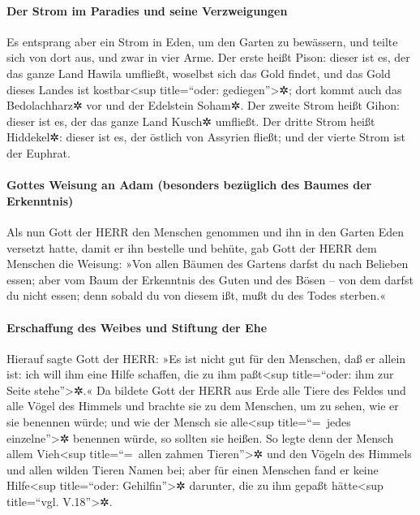 \hypertarget{der-strom-im-paradies-und-seine-verzweigungen}{%
\paragraph{Der Strom im Paradies und seine
Verzweigungen}\label{der-strom-im-paradies-und-seine-verzweigungen}}

 Es entsprang aber ein Strom in Eden, um den Garten zu
bewässern, und teilte sich von dort aus, und zwar in vier Arme.
 Der erste heißt Pison: dieser ist es, der das ganze Land
Hawila umfließt, woselbst sich das Gold findet,  und das
Gold dieses Landes ist kostbar\textless sup title=``oder:
gediegen''\textgreater✲; dort kommt auch das Bedolachharz✲ vor und der
Edelstein Soham✲.  Der zweite Strom heißt Gihon: dieser
ist es, der das ganze Land Kusch✲ umfließt.  Der dritte
Strom heißt Hiddekel✲: dieser ist es, der östlich von Assyrien fließt;
und der vierte Strom ist der Euphrat.

\hypertarget{gottes-weisung-an-adam-besonders-bezuxfcglich-des-baumes-der-erkenntnis}{%
\paragraph{Gottes Weisung an Adam (besonders bezüglich des Baumes der
Erkenntnis)}\label{gottes-weisung-an-adam-besonders-bezuxfcglich-des-baumes-der-erkenntnis}}

 Als nun Gott der HERR den Menschen genommen und ihn in
den Garten Eden versetzt hatte, damit er ihn bestelle und behüte,
 gab Gott der HERR dem Menschen die Weisung: »Von allen
Bäumen des Gartens darfst du nach Belieben essen;  aber
vom Baum der Erkenntnis des Guten und des Bösen -- von dem darfst du
nicht essen; denn sobald du von diesem ißt, mußt du des Todes sterben.«

\hypertarget{erschaffung-des-weibes-und-stiftung-der-ehe}{%
\paragraph{Erschaffung des Weibes und Stiftung der
Ehe}\label{erschaffung-des-weibes-und-stiftung-der-ehe}}

 Hierauf sagte Gott der HERR: »Es ist nicht gut für den
Menschen, daß er allein ist: ich will ihm eine Hilfe schaffen, die zu
ihm paßt\textless sup title=``oder: ihm zur Seite stehe''\textgreater✲.«
 Da bildete Gott der HERR aus Erde alle Tiere des Feldes
und alle Vögel des Himmels und brachte sie zu dem Menschen, um zu sehen,
wie er sie benennen würde; und wie der Mensch sie alle\textless sup
title=``=~jedes einzelne''\textgreater✲ benennen würde, so sollten sie
heißen.  So legte denn der Mensch allem Vieh\textless sup
title=``=~allen zahmen Tieren''\textgreater✲ und den Vögeln des Himmels
und allen wilden Tieren Namen bei; aber für einen Menschen fand er keine
Hilfe\textless sup title=``oder: Gehilfin''\textgreater✲ darunter, die
zu ihm gepaßt hätte\textless sup title=``vgl. V.18''\textgreater✲.

